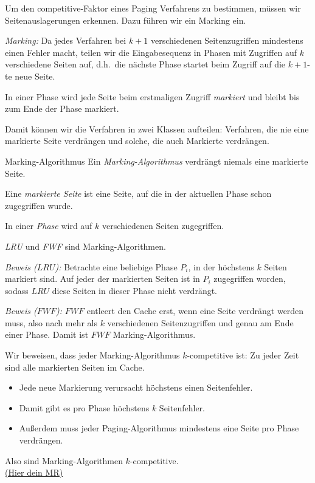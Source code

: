 \documentclass{panikzettel}
\newcommand{\mrhere}[1]{\hyperref[mrExp:#1]{\hypertarget{mr:#1}{\small\sffamily(Hier dein MR)}}}
\begin{document}
Um den competitive-Faktor eines Paging Verfahrens zu bestimmen, müssen wir Seitenauslagerungen erkennen. Dazu führen wir ein Marking ein.

\begin{halfboxl}
    \textit{Marking:} Da jedes Verfahren bei $k+1$ verschiedenen Seitenzugriffen mindestens einen Fehler macht, teilen wir die Eingabesequenz in Phasen mit Zugriffen auf $k$ verschiedene Seiten auf, d.h.\ die nächste Phase startet beim Zugriff auf die $k+1$-te neue Seite.

    In einer Phase wird jede Seite beim erstmaligen Zugriff \textit{markiert} und bleibt bis zum Ende der Phase markiert.

    Damit können wir die Verfahren in zwei Klassen aufteilen: Verfahren, die nie eine markierte Seite verdrängen und solche, die auch Markierte verdrängen.
\end{halfboxl}%
\begin{halfboxr}
\vspace{-\baselineskip}
    \begin{defi}{Marking-Algorithmus}
        Ein \emph{Marking-Algorithmus} verdrängt niemals eine markierte Seite.

        Eine \emph{markierte Seite} ist eine Seite, auf die in der aktuellen Phase schon zugegriffen wurde.

        In einer \emph{Phase} wird auf $k$ verschiedenen Seiten zugegriffen.
    \end{defi}
\end{halfboxr}

\textit{LRU} und \textit{FWF} sind Marking-Algorithmen.

\begin{halfboxl}
    \textit{Beweis ($LRU$):} Betrachte eine beliebige Phase $P_i$, in der höchstens $k$ Seiten markiert sind. Auf jeder der markierten Seiten ist in $P_i$ zugegriffen worden, sodass $LRU$ diese Seiten in dieser Phase nicht verdrängt.
\end{halfboxl}%
\begin{halfboxr}
\vspace{-\baselineskip}
    \textit{Beweis ($FWF$):} $FWF$ entleert den Cache erst, wenn eine Seite verdrängt werden muss, also nach mehr als $k$ verschiedenen Seitenzugriffen und genau am Ende einer Phase. Damit ist $FWF$ Marking-Algorithmus.
\end{halfboxr}

Wir beweisen, dass jeder Marking-Algorithmus $k$-competitive ist: Zu jeder Zeit sind alle markierten Seiten im Cache.
\begin{itemize}
    \item Jede neue Markierung verursacht höchstens einen Seitenfehler.
    \item Damit gibt es pro Phase höchstens $k$ Seitenfehler.
    \item Außerdem muss jeder Paging-Algorithmus mindestens eine Seite pro Phase verdrängen.
\end{itemize}
Also sind Marking-Algorithmen $k$-competitive.  \\
\mrhere{marking-comp}
\end{document}
